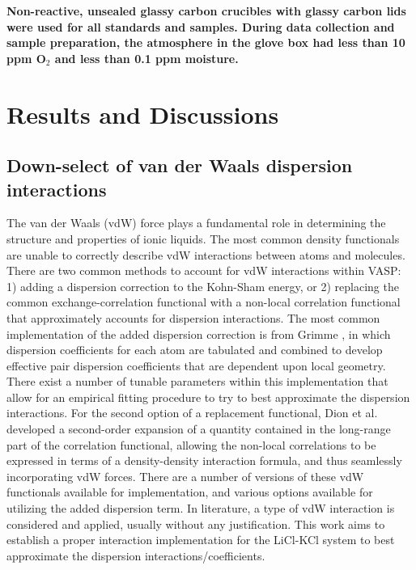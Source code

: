 \documentclass[review]{elsarticle}
\providecommand{\DIFaddtex}[1]{{\bf #1}} %
\providecommand{\DIFdeltex}[1]{} %
\providecommand{\DIFaddbegin}{\protect\color{blue}} %
\providecommand{\DIFaddend}{\protect\color{black}} %
\providecommand{\DIFdelbegin}{\protect\color{red}} %
\providecommand{\DIFdelend}{\protect\color{black}} %
\providecommand{\DIFadd}[1]{\texorpdfstring{\DIFaddtex{#1}}{#1}} %
\providecommand{\DIFdel}[1]{\texorpdfstring{\DIFdeltex{#1}}{}} %
\newcommand{\DIFscaledelfig}{0.5}
\newlength{\DIFdelgraphicswidth} %
\newlength{\DIFdelgraphicsheight} %
\newcommand{\DIFaddincludegraphics}[2][]{{\color{blue}\fbox{\DIFOincludegraphics[#1]{#2}}}} %
\newcommand{\DIFdelincludegraphics}[2][]{%
\sbox{\DIFdelgraphicsbox}{\DIFOincludegraphics[#1]{#2}}%
\settoboxwidth{\DIFdelgraphicswidth}{\DIFdelgraphicsbox} %
\settoboxtotalheight{\DIFdelgraphicsheight}{\DIFdelgraphicsbox} %
\scalebox{\DIFscaledelfig}{%
\parbox[b]{\DIFdelgraphicswidth}{\usebox{\DIFdelgraphicsbox}\\[-\baselineskip] \rule{\DIFdelgraphicswidth}{0em}}\llap{\resizebox{\DIFdelgraphicswidth}{\DIFdelgraphicsheight}{%
\setlength{\unitlength}{\DIFdelgraphicswidth}%
\begin{picture}(1,1)%
\thicklines\linethickness{2pt} %
{\color[rgb]{1,0,0}\put(0,0){\framebox(1,1){}}}%
{\color[rgb]{1,0,0}\put(0,0){\line( 1,1){1}}}%
{\color[rgb]{1,0,0}\put(0,1){\line(1,-1){1}}}%
\end{picture}%
}\hspace*{3pt}}} %
} %
\DeclareRobustCommand{\DIFaddbegin}{\DIFOaddbegin \let\includegraphics\DIFaddincludegraphics} %
\DeclareRobustCommand{\DIFaddend}{\DIFOaddend \let\includegraphics\DIFOincludegraphics} %
\DeclareRobustCommand{\DIFdelbegin}{\DIFOdelbegin \let\includegraphics\DIFdelincludegraphics} %
\DeclareRobustCommand{\DIFdelend}{\DIFOaddend \let\includegraphics\DIFOincludegraphics} %
\begin{document}
\DIFadd{Non-reactive, unsealed glassy carbon crucibles with glassy carbon lids were used for all standards and samples. During data collection and sample preparation, the atmosphere in the glove box had less than 10 ppm O$_2$ and less than 0.1 ppm moisture. 
}


\DIFaddend \FloatBarrier

\section{Results and \DIFdelbegin \DIFdel{Discussion}\DIFdelend \DIFaddbegin \DIFadd{Discussions}\DIFaddend }

\subsection{Down-select of van der Waals dispersion interactions}

The van der Waals (vdW) force plays a fundamental role in determining the structure and properties of ionic liquids. The most common density functionals are unable to correctly describe vdW interactions between atoms and molecules.  There are two common methods to account for vdW interactions within VASP: 1) adding a dispersion correction to the Kohn-Sham energy, or 2) replacing the common exchange-correlation functional with a non-local correlation functional that approximately accounts for dispersion interactions. The most common implementation of the added dispersion correction is from Grimme \cite{Grimme2006,Grimme2010}, in which dispersion coefficients for each atom are tabulated and combined to develop effective pair dispersion coefficients that are dependent upon local geometry. There exist a number of tunable parameters within this implementation that allow for an empirical fitting procedure to try to best approximate the dispersion interactions. For the second option of a replacement functional, Dion et al.\cite{Dion2004} developed a second-order expansion of a quantity contained in the long-range part of the correlation functional, allowing the non-local correlations to be expressed in terms of a density-density interaction formula, and thus seamlessly incorporating vdW forces. There are a number of versions of these vdW functionals available for implementation, and various options available for utilizing the added dispersion term. In literature, a type of vdW interaction is considered and applied, usually without any justification. This work aims to establish a proper interaction implementation for the LiCl-KCl system to best approximate the dispersion interactions/coefficients. 
\end{document}
